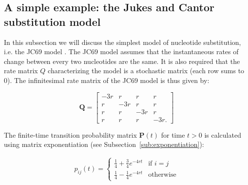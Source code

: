 \subsection{A simple example: the Jukes and Cantor substitution model\label{sub:jc69}}

In this subsection we will discuss the simplest model of nucleotide substitution, i.e. the JC69 model \citep{Jukes1969}.
The JC69 model assumes that the instantaneous rates of change between every two nucleotides are the same.
It is also required that the rate matrix $Q$ characterizing the model is a stochastic matrix (each row sums to 0).
The infinitesimal rate matrix of the JC69 model is thus given by:

\begin{equation}
\mathbf{Q}=\left[\begin{array}{cccc}
-3r & r & r & r\\
r & -3r & r & r\\
r & r & -3r & r\\
r & r & r & -3r.
\end{array}\right]
\label{eq:jc69}
\end{equation}

\noindent
The finite-time transition probability matrix $\mathbf{P}(t)$ for time $t>0$ is calculated using matrix exponentiation  (see Subsection~\ref{sub:exponentiation}):

\begin{align}
p_{ij}\left(t\right)=\begin{cases}
\frac{1}{4}+\frac{3}{4}e^{-4rt} & \text{if }i=j\\
\frac{1}{4}-\frac{1}{4}e^{-4rt} & \text{otherwise}
\end{cases}
\label{eq:jc69Finite}
\end{align}

